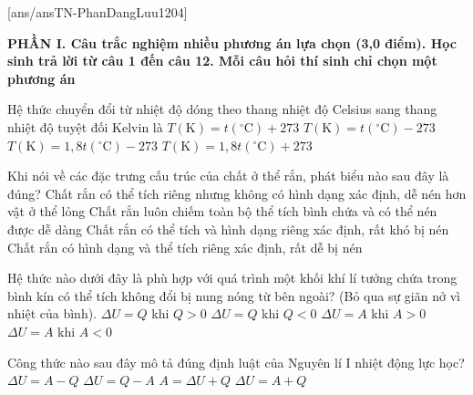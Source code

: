 [ans/ansTN-PhanDangLuu1204]

\noindent \textbf{PHẦN I. Câu trắc nghiệm nhiều phương án lựa chọn (3,0 điểm). Học sinh trả lời từ câu 1 đến câu 12. Mỗi câu hỏi thí sinh chỉ chọn một phương án}
\vspace{0.2cm}

\begin{ex}	Hệ thức chuyển đổi từ nhiệt độ dóng theo thang nhiệt độ Celsius sang thang nhiệt độ tuyệt đối Kelvin là
	\choice
	{\True $T(\text{K})=t(^\circ\text{C})+273$}
	{$T(\text{K})=t(^\circ\text{C})-273$}
	{$T(\text{K})=1,8t(^\circ\text{C})-273$}
	{$T(\text{K})=1,8t(^\circ\text{C})+273$}
\end{ex}

\begin{ex}	Khi nói về các đặc trưng cấu trúc của chất ở thể rắn, phát biểu nào sau đây là đúng?
	\choice
	{Chất rắn có thể tích riêng nhưng không có hình dạng xác định, dễ nén hơn vật ở thể lỏng}
	{Chất rắn luôn chiếm toàn bộ thể tích bình chứa và có thể nén được dễ dàng}
	{\True Chất rắn có thể tích và hình dạng riêng xác định, rất khó bị nén}
	{Chất rắn có hình dạng và thể tích riêng xác định, rất dễ bị nén}
\end{ex}

\begin{ex}	Hệ thức nào dưới đây là phù hợp với quá trình một khối khí lí tưởng chứa trong bình kín có thể tích không đổi bị nung nóng từ bên ngoài? (Bỏ qua sự giãn nở vì nhiệt của bình).
	\choice
	{\True $\Delta U=Q$ khi $Q>0$}
	{$\Delta U=Q$ khi $Q<0$}
	{$\Delta U=A$ khi $A>0$}
	{$\Delta U=A$ khi $A<0$}
\end{ex}

\begin{ex}	Công thức nào sau đây mô tả đúng định luật của Nguyên lí I nhiệt động lực học?
	\choice
	{$\Delta U=A-Q$}
	{$\Delta U=Q-A$}
	{$A=\Delta U+Q$}
	{\True $\Delta U=A+Q$}
\end{ex}

